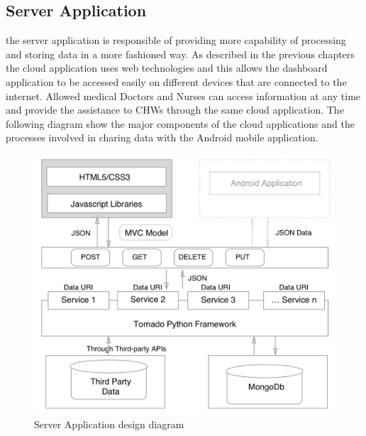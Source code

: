\subsection{Server Application}


the server application is responsible of providing more capability of processing and storing data in a more fashioned way. As described in the previous chapters the cloud application uses web technologies and this allows the dashboard application to be accessed easily on different devices that are connected to the internet. Allowed medical Doctors and Nurses can access information at any time and provide the assistance to CHWs through the same cloud application. The following diagram show the major components of the cloud applications and the processes involved in charing data with the Android mobile application.
\begin{figure}[H]
\centering
\includegraphics[width=12cm]{images/wegoo_web_building_blocks.png} %
\caption{Server Application design diagram}
\label{fig:fig-eg}
\end{figure}


